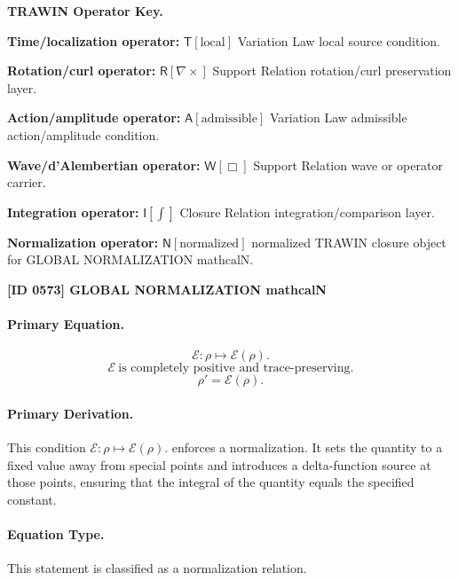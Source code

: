 \par\vspace{0.45\baselineskip}
\noindent\begin{minipage}[t]{\linewidth}
\begingroup
\small
\raggedright
\textbf{TRAWIN Operator Key.}\par
\noindent\textbf{Time/localization operator:} $\mathsf{T}\!\left[\mathrm{local}\right]$ Variation Law local source condition.\par
\noindent\textbf{Rotation/curl operator:} $\mathsf{R}\!\left[\nabla\times\right]$ Support Relation rotation/curl preservation layer.\par
\noindent\textbf{Action/amplitude operator:} $\mathsf{A}\!\left[\mathrm{admissible}\right]$ Variation Law admissible action/amplitude condition.\par
\noindent\textbf{Wave/d'Alembertian operator:} $\mathsf{W}\!\left[\Box\right]$ Support Relation wave or operator carrier.\par
\noindent\textbf{Integration operator:} $\mathsf{I}\!\left[\int\right]$ Closure Relation integration/comparison layer.\par
\noindent\textbf{Normalization operator:} $\mathsf{N}\!\left[\mathrm{normalized}\right]$ normalized TRAWIN closure object for GLOBAL NORMALIZATION mathcalN.\par
\endgroup
\end{minipage}

\clearpage
\noindent\textbf{[ID 0573] GLOBAL NORMALIZATION mathcalN}\par
\vspace{0.35em}
\paragraph{Primary Equation.}
\[
\mathcal{E}:\rho\mapsto \mathcal{E}(\rho).
\]
\[
\mathcal{E}\ \text{is completely positive and trace-preserving}.
\]
\[
\rho'=\mathcal{E}(\rho).
\]

\paragraph{Primary Derivation.}
This condition \( \mathcal{E}:\rho\mapsto \mathcal{E}(\rho). \) enforces a normalization. It sets the quantity to a fixed value away from special points and introduces a delta-function source at those points, ensuring that the integral of the quantity equals the specified constant.
\paragraph{Equation Type.}
This statement is classified as a normalization relation.

